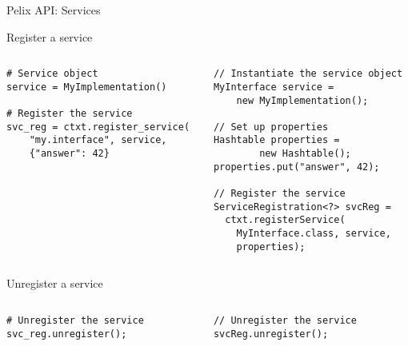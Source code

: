 \begin{frame}[fragile]{Pelix API: Services}
\begin{block}{Register a service}
\vspace{-.5em}
\begin{columns}
\begin{column}[b]{.45\textwidth}
\begin{verbatim}
# Service object
service = MyImplementation()

# Register the service
svc_reg = ctxt.register_service(
    "my.interface", service,
    {"answer": 42}
\end{verbatim}
\end{column}

\begin{column}{.5\textwidth}
\begin{verbatim}
// Instantiate the service object
MyInterface service = 
	new MyImplementation();

// Set up properties
Hashtable properties =
		new Hashtable();
properties.put("answer", 42);

// Register the service
ServiceRegistration<?> svcReg = 
  ctxt.registerService(
    MyInterface.class, service,
    properties);
\end{verbatim}
\end{column}
\end{columns}
\end{block}

\begin{block}{Unregister a service}
\vspace{-.5em}
\begin{columns}
\begin{column}{.5\textwidth}
\begin{verbatim}
# Unregister the service
svc_reg.unregister();
\end{verbatim}
\end{column}

\begin{column}{.5\textwidth}
\begin{verbatim}
// Unregister the service
svcReg.unregister();
\end{verbatim}
\end{column}
\end{columns}
\end{block}
\end{frame}
